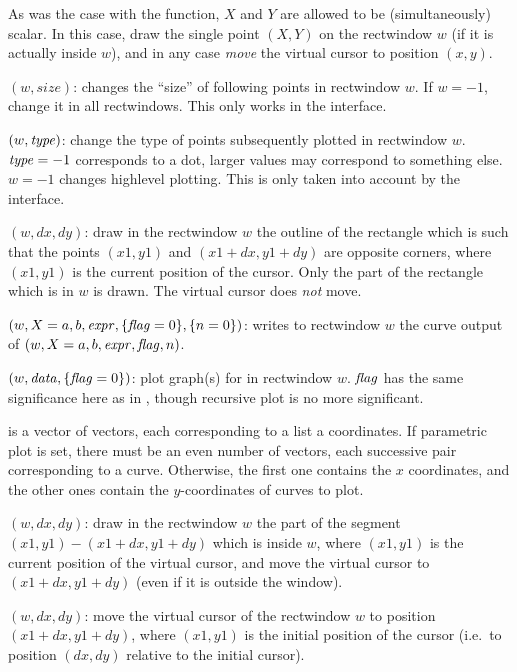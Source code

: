 As was the case with the  function, $X$ and $Y$ are allowed to
be (simultaneously) scalar. In this case, draw the single point $(X,Y)$ on
the rectwindow $w$ (if it is actually inside $w$), and in any case
\emph{move} the virtual cursor to position $(x,y)$.

$(w,size)$: changes the ``size'' of following
points in rectwindow $w$. If $w = -1$, change it in all rectwindows.
This only works in the  interface.

$(w,\hbox{\it type\/})$:  change the type of
points subsequently plotted in rectwindow $w$. $\hbox{\it type\/} = -1$
corresponds to a dot, larger values may correspond to something else. $w = -1$
changes highlevel plotting. This is only taken into account by the
 interface.

$(w,dx,dy)$: draw in the rectwindow $w$ the outline of
the rectangle which is such that the points $(x1,y1)$ and $(x1+dx,y1+dy)$ are
opposite corners, where $(x1,y1)$ is the current position of the cursor.
Only the part of the rectangle which is in $w$ is drawn. The virtual cursor
does \emph{not} move.

$(w,X=a,b,\hbox{\it expr\/},\{\hbox{\it f\kern0pt lag\/}=0\},\{n=0\})$: writes to
rectwindow $w$ the curve output of $(w,X=a,b,\hbox{\it expr\/},\hbox{\it f\kern0pt lag\/},n)$.

$(w,\hbox{\it data\/},\{\hbox{\it f\kern0pt lag\/}=0\})$: plot graph(s) for
 in rectwindow $w$. $\hbox{\it f\kern0pt lag\/}$ has the same significance here as in
, though recursive plot is no more significant.

 is a vector of vectors, each corresponding to a list a coordinates.
If parametric plot is set, there must be an even number of vectors, each
successive pair corresponding to a curve. Otherwise, the first one contains
the $x$ coordinates, and the other ones contain the $y$-coordinates
of curves to plot.

$(w,dx,dy)$: draw in the rectwindow $w$ the part of the
segment $(x1,y1)-(x1+dx,y1+dy)$ which is inside $w$, where $(x1,y1)$ is the
current position of the virtual cursor, and move the virtual cursor to
$(x1+dx,y1+dy)$ (even if it is outside the window).

$(w,dx,dy)$: move the virtual cursor of the rectwindow
$w$ to position $(x1+dx,y1+dy)$, where $(x1,y1)$ is the initial position of
the cursor (i.e.~to position $(dx,dy)$ relative to the initial cursor).

